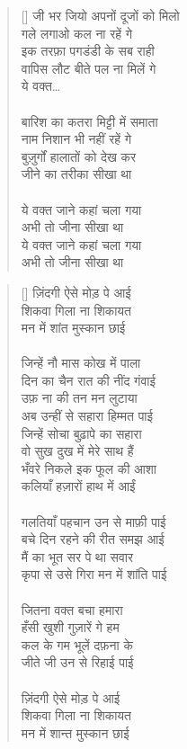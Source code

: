 \begin{verse}[\versewidth]
{जी भर जियो अपनों दूजों को मिलो\\
गले लगाओ कल ना रहें गे\\
इक तरफ़ा पगडंडी के सब राही\\
वापिस लौट बीते पल ना मिलें गे\\
ये वक्त…\\
\\
बारिश का कतरा मिट्टी में समाता\\
नाम निशान भी नहीं रहें गे\\
बुज़ुर्गों हालातों को देख कर\\
जीने का तरीका सीखा था\\
\\
ये वक्त जाने कहां चला गया\\
अभी तो जीना सीखा था\\
ये वक्त जाने कहां चला गया\\
अभी तो जीना सीखा था
}\end{verse}

\begin{verse}[\versewidth]\texthindi{
ज़िंदगी ऐसे मोड़ पे आई\\
शिकवा गिला ना शिकायत\\
मन में शांत मुस्कान छाई\\
\\
जिन्हें नौ मास कोख में पाला\\
दिन का चैन रात की नींद गंवाई\\
उफ़ ना की तन मन लुटाया\\
अब उन्हीं से सहारा हिम्मत पाई\\
जिन्हें सोचा बुढ़ापे का सहारा\\
वो सुख दुख में मेरे साथ हैं\\
भँवरे निकले इक फूल की आशा\\
कलियाँ हज़ारों हाथ में आईं\\
\\
गलतियाँ पहचान उन से माफ़ी पाई\\
बचे दिन रहने की रीत समझ आई\\
मैं का भूत सर पे था सवार\\
कृपा से उसे गिरा मन में शांति पाई\\
\\
जितना वक्त बचा हमारा\\
हँसी खुशी गुज़ारें गे हम\\
कल के गम भूलें दफ़ना के\\
जीते जी उन से रिहाई पाई\\
\\
ज़िंदगी ऐसे मोड़ पे आई\\
शिकवा गिला ना शिकायत\\
मन में शान्त मुस्कान छाई
}\end{verse}

